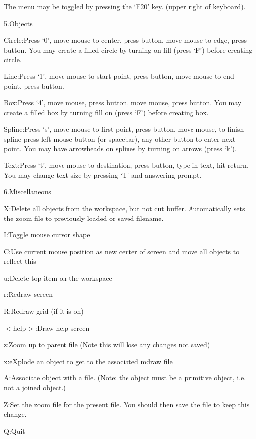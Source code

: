 The menu may be toggled by pressing the `F20' key. (upper right of
keyboard).

\blank
{\modernlarge \item{5.}{Objects }}
\item{Circle:}{Press `0', move mouse to center, press button, move mouse to
edge, press button. You may create a filled circle by turning on fill (press
`F') before creating circle.}
\item{Line:}{Press `1', move mouse to start point, press button, move mouse to
end point, press button. }
\item{Box:}{Press `4', move mouse, press button, move mouse, press button. You
may create a filled box by turning fill on (press `F') before creating box. }
\item{Spline:}{Press `s', move mouse to first point, press button, move mouse, 
to finish spline press left mouse button (or spacebar), any other button to 
enter next point. You may have arrowheads on splines by turning on arrows (press
`k'). }
\item{Text:}{Press `t', move mouse to destination, press button, type in text,
hit return. You may change text size by pressing `T' and answering prompt. }

\blank
{\modernlarge \item{6.}{Miscellaneous}}
\item{X:}{Delete all objects from the workspace, but not cut buffer.
Automatically sets the zoom file to previously loaded or saved filename.}
\item{I:}{Toggle mouse cursor shape}
\item{C:}{Use current mouse position as new center of screen and move all
objects to reflect this}
\item{u:}{Delete top item on the workspace}
\item{r:}{Redraw screen}
\item{R:}{Redraw grid (if it is on)}
\item{$<$help$>$:}{Draw help screen}
\item{z:}{Zoom up to parent file (Note this will lose any changes not saved)}
\item{x:}{eXplode an object to get to the associated mdraw file}
\item{A:}{Associate object with a file. (Note: the object must be a primitive 
object, i.e. not a joined object.)}
\item{Z:}{Set the zoom file for the present file. You should then save the file
to keep this change.}
\item{Q:}{Quit}

\bye
                                                   
